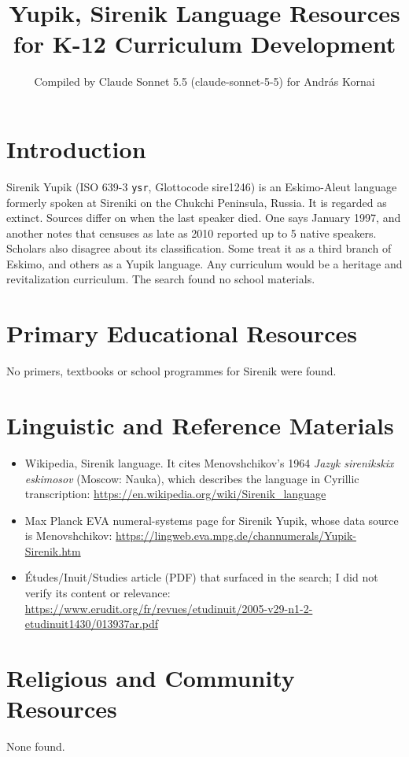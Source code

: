 \documentclass[12pt]{article}
\title{Yupik, Sirenik Language Resources for K-12 Curriculum Development}
\author{Compiled by Claude Sonnet 5.5 (claude-sonnet-5-5) for Andr\'as Kornai}
\date{}
\begin{document}
\maketitle

\section{Introduction}
Sirenik Yupik (ISO 639-3 \texttt{ysr}, Glottocode sire1246) is an Eskimo-Aleut language formerly spoken at Sireniki on the Chukchi Peninsula, Russia. It is regarded as extinct. Sources differ on when the last speaker died. One says January 1997, and another notes that censuses as late as 2010 reported up to 5 native speakers. Scholars also disagree about its classification. Some treat it as a third branch of Eskimo, and others as a Yupik language. Any curriculum would be a heritage and revitalization curriculum. The search found no school materials.

\section{Primary Educational Resources}
No primers, textbooks or school programmes for Sirenik were found.

\section{Linguistic and Reference Materials}
\begin{itemize}
\item Wikipedia, Sirenik language. It cites Menovshchikov's 1964 \emph{Jazyk sirenikskix eskimosov} (Moscow: Nauka), which describes the language in Cyrillic transcription: \url{https://en.wikipedia.org/wiki/Sirenik_language}
\item Max Planck EVA numeral-systems page for Sirenik Yupik, whose data source is Menovshchikov: \url{https://lingweb.eva.mpg.de/channumerals/Yupik-Sirenik.htm}
\item \'Etudes/Inuit/Studies article (PDF) that surfaced in the search; I did not verify its content or relevance: \url{https://www.erudit.org/fr/revues/etudinuit/2005-v29-n1-2-etudinuit1430/013937ar.pdf}
\end{itemize}

\section{Religious and Community Resources}
None found.
\end{document}
